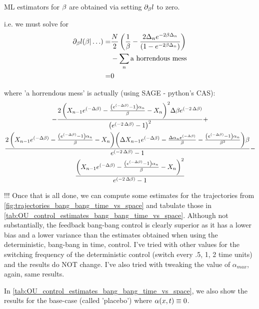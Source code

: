 ML estimators for $\beta$ are obtained via setting ${\partial}_{\beta} l$ to zero.

i.e. we must solve for 
\begin{align}
{\partial}_\beta l( \beta|\ldots)  
=& \frac{N}{2} \left(\frac 1 {\beta} - 
\frac{2 \Delta_n e^{-2\beta\Delta_n}}{(1-e^{-2\beta\Delta_n})} \right) \nonumber \\ 
& -\sum_n \textrm{a horrendous mess}  \nonumber
\\
=& 0 
\label{eq:OUML_estimate_beta}
\end{align}


where 'a horrendous mess' is actually (using SAGE - python's CAS):
\begin{multline}
-\frac{2 \, {\left(X_{n-1} e^{\left(-\Delta \beta\right)} -
\frac{{\left(e^{\left(-\Delta \beta\right)} - 1\right)}
\alpha_{n}}{\beta} - X_{n}\right)}^{2} \Delta \beta e^{\left(-2 \,
\Delta \beta\right)}}{{\left(e^{\left(-2 \, \Delta \beta\right)} -
1\right)}^{2}} 
+
\\
 \frac{2 \, {\left(X_{n-1} e^{\left(-\Delta
\beta\right)} - \frac{{\left(e^{\left(-\Delta \beta\right)} - 1\right)}
\alpha_{n}}{\beta} - X_{n}\right)} {\left(\Delta X_{n-1}
e^{\left(-\Delta \beta\right)} - \frac{\Delta \alpha_{n} e^{\left(-\Delta
\beta\right)}}{\beta} - \frac{{\left(e^{\left(-\Delta \beta\right)} -
1\right)} \alpha_{n}}{\beta^{2}}\right)} \beta}{e^{\left(-2 \, \Delta
\beta\right)} - 1} -
\\ \frac{{\left(X_{n-1} e^{\left(-\Delta
\beta\right)} - \frac{{\left(e^{\left(-\Delta \beta\right)} - 1\right)}
\alpha_{n}}{\beta} - X_{n}\right)}^{2}}{e^{\left(-2 \, \Delta
\beta\right)} - 1}
\end{multline}

!!!
Once that is all done, we can compute some estimates for the trajectories
from \cref{fig:trajectories_bang_bang_time_vs_space} and tabulate those in
\cref{tab:OU_control_estimates_bang_bang_time_vs_space}. Although not
substantially, the feedback bang-bang control is clearly superior as it has a 
lower bias and a lower variance than the estimates obtained when using the
deterministic, bang-bang in time, control. I've tried with other values for the
switching frequency of the deterministic control (switch every .5, 1, 2
time units) and the results do NOT change. I've also tried with tweaking the
value of $\alpha_{max}$, again, same results. 

In \cref{tab:OU_control_estimates_bang_bang_time_vs_space}, we also show the
results for the base-case (called 'placebo') where $\alpha(x,t) \equiv 0$.

